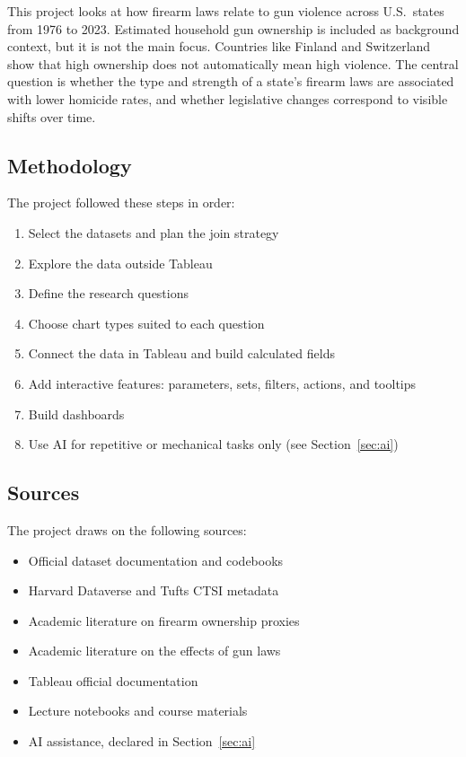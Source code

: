 \documentclass[a4paper,11pt]{article}
\begin{document}
\par
This project looks at how firearm laws relate to gun violence across U.S.\
states from 1976 to 2023. Estimated household gun ownership is included as
background context, but it is not the main focus. Countries like Finland and
Switzerland show that high ownership does not automatically mean high violence.
The central question is whether the type and strength of a state's firearm laws
are associated with lower homicide rates, and whether legislative changes
correspond to visible shifts over time.

\subsection{Methodology}

\par
The project followed these steps in order:
\begin{enumerate}
	\item Select the datasets and plan the join strategy
	\item Explore the data outside Tableau
	\item Define the research questions
	\item Choose chart types suited to each question
	\item Connect the data in Tableau and build calculated fields
	\item Add interactive features: parameters, sets, filters, actions, and tooltips
	\item Build dashboards
	\item Use AI for repetitive or mechanical tasks only
	      (see Section~\ref{sec:ai})
\end{enumerate}

\subsection{Sources}

\par
The project draws on the following sources:

\begin{itemize}
	\item Official dataset documentation and codebooks~\autocite{ownershipproxy,statefirearmlaw}
	\item Harvard Dataverse and Tufts CTSI metadata~\autocite{kang2023,statefirearmlaw}
	\item Academic literature on firearm ownership proxies~\autocite{extendingfss,kang2023}
	\item Academic literature on the effects of gun laws~\autocite{kopernij1999,koper2004,donohue2022}
	\item Tableau official documentation~\autocite{tableau}
	\item Lecture notebooks and course materials
	\item AI assistance, declared in Section~\ref{sec:ai}
\end{itemize}
\end{document}
